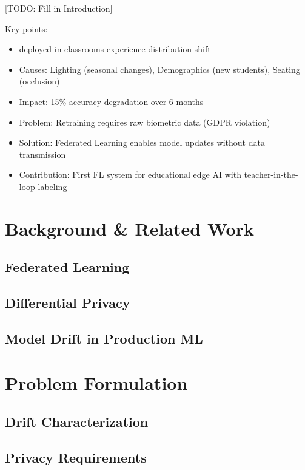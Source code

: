 \documentclass[conference]{IEEEtran}
\begin{document}
[TODO: Fill in Introduction]

Key points:
\begin{itemize}
    \item deployed in classrooms experience distribution shift
    \item Causes: Lighting (seasonal changes), Demographics (new students), Seating (occlusion)
    \item Impact: 15\% accuracy degradation over 6 months
    \item Problem: Retraining requires raw biometric data (GDPR violation)
    \item Solution: Federated Learning enables model updates without data transmission
    \item Contribution: First FL system for educational edge AI with teacher-in-the-loop labeling
\end{itemize}

\section{Background \& Related Work}

\subsection{Federated Learning}
\subsection{Differential Privacy}
\subsection{Model Drift in Production ML}

\section{Problem Formulation}

\subsection{Drift Characterization}
\subsection{Privacy Requirements}
\end{document}
